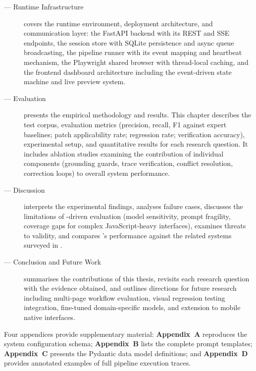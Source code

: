 \begin{description}
  \item[ --- Runtime Infrastructure] covers the runtime environment, deployment architecture, and communication layer: the FastAPI backend with its REST and SSE endpoints, the session store with SQLite persistence and async queue broadcasting, the pipeline runner with its event mapping and heartbeat mechanism, the Playwright shared browser with thread-local caching, and the frontend dashboard architecture including the event-driven state machine and live preview system.

  \item[ --- Evaluation] presents the empirical methodology and results. This chapter describes the test corpus, evaluation metrics (precision, recall, F1 against expert baselines; patch applicability rate; regression rate; verification accuracy), experimental setup, and quantitative results for each research question. It includes ablation studies examining the contribution of individual components (grounding guards, trace verification, conflict resolution, correction loops) to overall system performance.

  \item[ --- Discussion] interprets the experimental findings, analyses failure cases, discusses the limitations of -driven evaluation (model sensitivity, prompt fragility, coverage gaps for complex JavaScript-heavy interfaces), examines threats to validity, and compares \versimux{}'s performance against the related systems surveyed in .

  \item[ --- Conclusion and Future Work] summarises the contributions of this thesis, revisits each research question with the evidence obtained, and outlines directions for future research including multi-page workflow evaluation, visual regression testing integration, fine-tuned domain-specific models, and extension to mobile native interfaces.
\end{description}

\noindent Four appendices provide supplementary material: \textbf{Appendix~A} reproduces the system configuration schema; \textbf{Appendix~B} lists the complete  prompt templates; \textbf{Appendix~C} presents the Pydantic data model definitions; and \textbf{Appendix~D} provides annotated examples of full pipeline execution traces.

